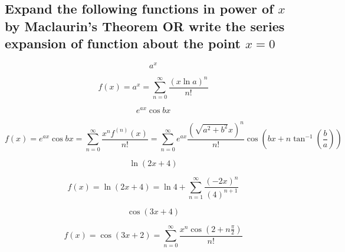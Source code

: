 \subsection{Expand the following functions in power of $x$ by Maclaurin’s Theorem OR write the series expansion of function about the point $x = 0$}
\begin{asign}
	\[a^x\]
\end{asign}
\begin{anse}
	\[f(x)=a^x=\sum_{n=0}^{\infty}\frac{(x\ln a)^n}{n!}\]
\end{anse}
\begin{asign}
	\[e^{ax}\cos bx\]
\end{asign}
\begin{anse}
	\[f(x)=e^{ax}\cos bx=\sum_{n=0}^{\infty}\frac{x^nf^{(n)}(x)}{n!}=\sum_{n=0}^{\infty}e^{ax}\frac{(\sqrt{a^2+b^2}x)^n}{n!}\cos(bx+n\tan^{-1}\left(\frac{b}{a}\right)) \]
\end{anse}
\begin{asign}
	\[\ln(2x+4)\]
\end{asign}
\begin{anse}
	\[f(x)=\ln(2x+4)=\ln 4+\sum_{n=1}^{\infty}\frac{(-2x)^n}{(4)^{n+1}}\]
\end{anse}
\begin{asign}
	\[\cos(3x+4)\]
\end{asign}
\begin{anse}
	\[f(x)=\cos(3x+2)=\sum_{n=0}^{\infty}\frac{x^n\cos(2+n\frac{\pi}{2})}{n!}\]
\end{anse}
